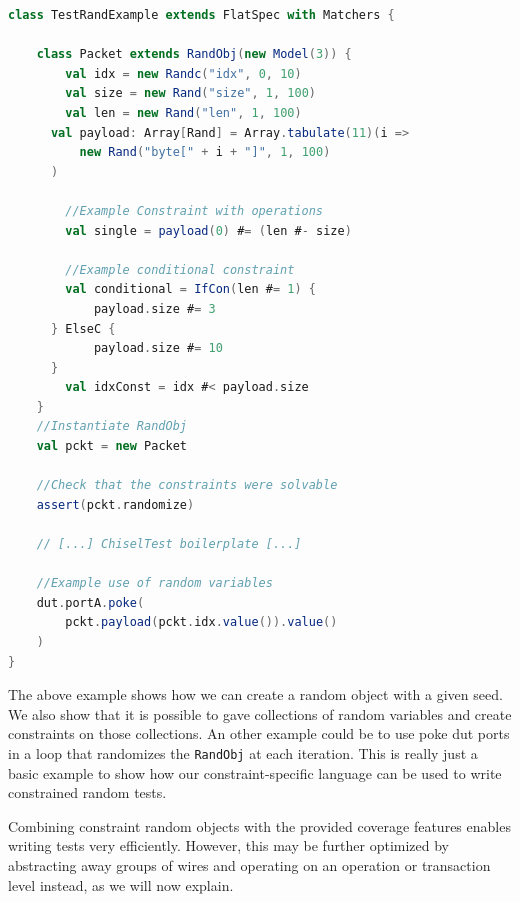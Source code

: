 \documentclass[conference]{IEEEtran}
\newcommand{\code}[1]{{\small{\texttt{#1}}}}
\begin{document}
\begin{lstlisting}[language=scala, caption={Random object toy example in Scala}, label={lst:randobjscala}]
class TestRandExample extends FlatSpec with Matchers {
    
    class Packet extends RandObj(new Model(3)) {
    	val idx = new Randc("idx", 0, 10)
    	val size = new Rand("size", 1, 100)
    	val len = new Rand("len", 1, 100)
      val payload: Array[Rand] = Array.tabulate(11)(i => 
          new Rand("byte[" + i + "]", 1, 100)
      )
        
    	//Example Constraint with operations
    	val single = payload(0) #= (len #- size)
	
	    //Example conditional constraint
	    val conditional = IfCon(len #= 1) {
            payload.size #= 3
   	  } ElseC {
            payload.size #= 10
   	  }
	    val idxConst = idx #< payload.size
    }
    //Instantiate RandObj
    val pckt = new Packet
    
    //Check that the constraints were solvable
    assert(pckt.randomize)
    
    // [...] ChiselTest boilerplate [...]
    
    //Example use of random variables
    dut.portA.poke(
    	pckt.payload(pckt.idx.value()).value()
    )
}

\end{lstlisting}

The above example shows how we can create a random object with a given seed. We also show that it is possible to gave collections of random variables and create constraints on those collections. An other example could be to use poke dut ports in a loop that randomizes the \texttt{RandObj} at each iteration. This is really just a basic example to show how our constraint-specific language can be used to write constrained random tests.


Combining constraint random objects with the provided coverage features enables writing tests very efficiently. However, this may be further optimized by abstracting away groups of wires and operating on an operation or transaction level instead, as we will now explain.
\end{document}
